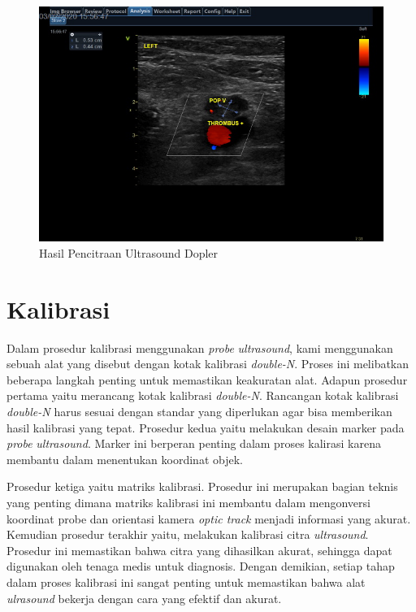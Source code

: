 \begin{figure}[H]
	\centering
	\includegraphics[scale= 0.5]{bab2/yud8Dopler.jpg}
	\caption{Hasil Pencitraan Ultrasound Dopler}
	\label{fig:dopler}
\end{figure}


\section{Kalibrasi}
Dalam prosedur kalibrasi menggunakan \textit{probe} \textit{ultrasound}, kami menggunakan sebuah alat yang disebut dengan kotak kalibrasi \textit{double-N}. Proses ini melibatkan beberapa langkah penting untuk memastikan keakuratan alat. Adapun prosedur pertama yaitu merancang kotak kalibrasi \textit{double-N}. Rancangan kotak kalibrasi \textit{double-N} harus sesuai dengan standar yang diperlukan agar bisa memberikan hasil kalibrasi yang tepat. Prosedur kedua yaitu melakukan desain marker pada \textit{probe} \textit{ultrasound}. Marker ini berperan penting dalam proses kalirasi karena membantu dalam menentukan koordinat objek.

Prosedur ketiga yaitu matriks kalibrasi. Prosedur ini merupakan bagian teknis yang penting dimana matriks kalibrasi ini membantu dalam mengonversi koordinat probe dan orientasi kamera \textit{optic track} menjadi informasi yang akurat. Kemudian prosedur terakhir yaitu, melakukan kalibrasi citra \textit{ultrasound}. Prosedur ini memastikan bahwa citra yang dihasilkan akurat, sehingga dapat digunakan oleh tenaga medis untuk diagnosis. Dengan demikian, setiap tahap dalam proses kalibrasi ini sangat penting untuk memastikan bahwa alat \textit{ulrasound} bekerja dengan cara yang efektif dan akurat.

